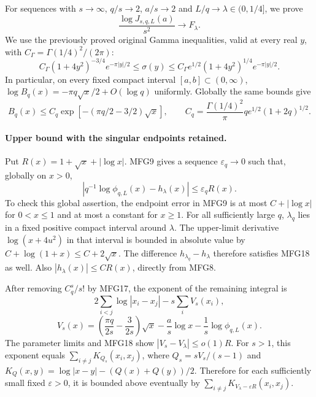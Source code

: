 For sequences with $s\to\infty$, $q/s\to2$, $a/s\to2$ and
$L/q\to\lambda\in(0,1/4]$, we prove
\[
 \boxed{\frac{\log J_{s,q,L}(a)}{s^2}\longrightarrow F_\lambda.}
 \tag{MFG15}
\]
We use the previously proved original Gamma inequalities, valid at every
real $y$, with $C_\Gamma=\Gamma(1/4)^2/(2\pi)$:
\[
 C_\Gamma(1+4y^2)^{-3/4}e^{-\pi|y|/2}
 \le\sigma(y)\le
 C_\Gamma e^{1/2}(1+4y^2)^{1/4}e^{-\pi|y|/2}.
 \tag{MFG16}
\]
In particular, on every fixed compact interval $[a,b]\subset(0,\infty)$,
$\log B_q(x)=-\pi q\sqrt x/2+O(\log q)$ uniformly. Globally the
same bounds give
\[
 B_q(x)\le C_q\exp[-(\pi q/2-3/2)\sqrt x],
 \qquad C_q=\frac{\Gamma(1/4)^2}{\pi}
                     q e^{1/2}(1+2q)^{1/2}.
 \tag{MFG17}
\]

\paragraph{Upper bound with the singular endpoints retained.}
Put $R(x)=1+\sqrt x+|\log x|$. MFG9 gives a sequence
$\varepsilon_q\to0$ such that, globally on $x>0$,
\[
 \left|q^{-1}\log\phi_{q,L}(x)-h_\lambda(x)\right|
                  \le\varepsilon_q R(x).
 \tag{MFG18}
\]
To check this global assertion, the endpoint error in MFG9 is at most
$C+|\log x|$ for $0<x\le1$ and at most a constant for $x\ge1$.
For all sufficiently large $q$, $\lambda_q$ lies in a fixed positive
compact interval around $\lambda$. The upper-limit derivative
$\log(x+4u^2)$ in that interval is bounded in absolute value by
$C+\log(1+x)\le C+2\sqrt x$. The difference
$h_{\lambda_q}-h_\lambda$ therefore satisfies MFG18 as well.
Also $|h_\lambda(x)|\le C R(x)$, directly from MFG8.

After removing $C_q^s/s!$ by MFG17, the exponent of the remaining
integral is
\[
 2\sum_{i<j}\log|x_i-x_j|-s\sum_i V_s(x_i),
\]
\[
 V_s(x)=\left(\frac{\pi q}{2s}-\frac3{2s}\right)\sqrt x
        -\frac as\log x-\frac1s\log\phi_{q,L}(x).
\]
The parameter limits and MFG18 show
$|V_s-V_\lambda|\le o(1)R$. For $s>1$, this exponent equals
$\sum_{i\ne j}K_{Q_s}(x_i,x_j)$, where $Q_s=sV_s/(s-1)$ and
$K_Q(x,y)=\log|x-y|-(Q(x)+Q(y))/2$. Therefore for each sufficiently
small fixed $\varepsilon>0$, it is bounded above eventually by
$\sum_{i\ne j}K_{V_\lambda-\varepsilon R}(x_i,x_j)$.

